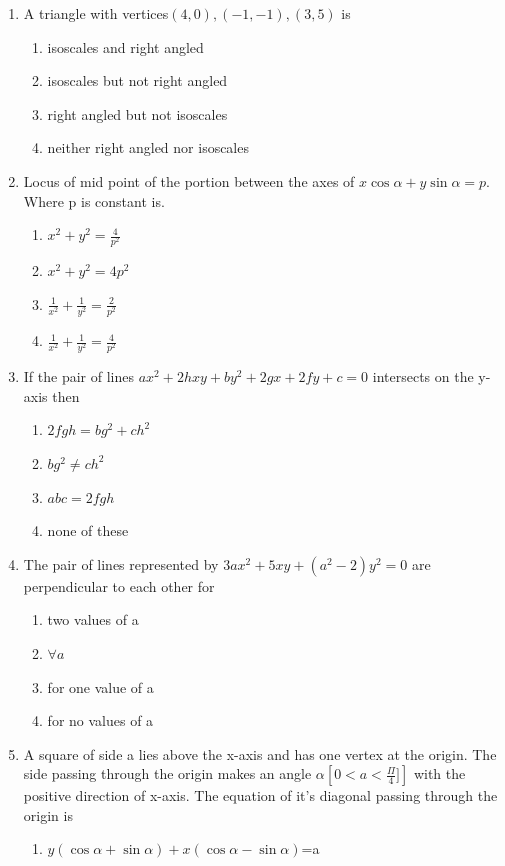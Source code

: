 \documentclass[12pt]{article}
\begin{document}
\begin{enumerate}
\item A triangle with vertices$(4,0),(-1,-1 ),(3,5)$ is
\begin{enumerate}
\item isoscales and right angled
\item isoscales  but not right angled
\item right angled but not isoscales 
\item neither right angled nor isoscales 
\end{enumerate}
\item Locus of mid point of the portion between the axes of $x\cos\alpha+y\sin\alpha=p$. Where p is constant is.
\begin{enumerate}
\item $x^2+y^2=\frac{4}{p^2}$ 
\item $x^2+y^2=4p^2$
\item$\frac{1}{x^2}+\frac{1}{y^2}=\frac{2}{p^2}$ 
\item $\frac{1}{x^2}+\frac{1}{y^2}=\frac{4}{p^2}$ 
\end{enumerate}
\item If the pair of lines $ax^2+2hxy+by^2+2gx+2fy+c=0$ intersects on the y-axis then
\begin{enumerate}
\item $2fgh=bg^2+ch^2$ 
\item $bg^2\neq ch^2$
\item $abc=2fgh$
\item none of these
\end{enumerate}
\item The pair of lines represented by $3ax^2+5xy+(a^2-2)y^2=0$ are perpendicular to each other for 
\begin{enumerate}
\item two values of a
\item $\forall a$
\item for one value of a 
\item for no values of a
\end{enumerate}
\item A square of side a lies above the x-axis and has one vertex at the origin. The side passing through the origin makes an angle $\alpha \left[ 0<a<\frac{\Pi}{4}]\right]$ with the positive direction of x-axis. The equation of it's diagonal passing through the origin is 
\begin{enumerate}
\item $y(\cos\alpha+\sin\alpha)+x(\cos\alpha-\sin\alpha)$=a

\end{enumerate}
\end{enumerate}
\end{document}
